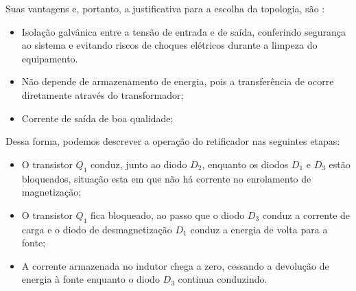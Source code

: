 Suas vantagens e, portanto, a justificativa para a escolha da topologia, são \cite{Conversores}:

\begin{itemize}
    \item Isolação galvânica entre a tensão de entrada e de saída, conferindo segurança ao sistema e evitando riscos de choques elétricos durante a limpeza do equipamento. 
    
    \item Não depende de armazenamento de energia, pois a transferência de ocorre diretamente através do transformador;
    
    \item Corrente de saída de boa qualidade;
    
\end{itemize}

Dessa forma, podemos descrever a operação do retificador nas seguintes etapas:

\begin{itemize}
    \item  O transistor $Q_{1}$ conduz, junto ao diodo $D_{2}$, enquanto os diodos $D_{1}$ e $D_{3}$ estão bloqueados, situação esta em que não há corrente no enrolamento de magnetização;
    
    \item O transistor $Q_{1}$ fica bloqueado, ao passo que o diodo $D_{3}$ conduz a corrente de carga e o diodo de desmagnetização $D_{1}$ conduz a energia de volta para a fonte;
    
    \item  A corrente armazenada no indutor chega a zero, cessando a devolução de energia à fonte enquanto o diodo $D_{3}$ continua conduzindo. 
    
\end{itemize}

